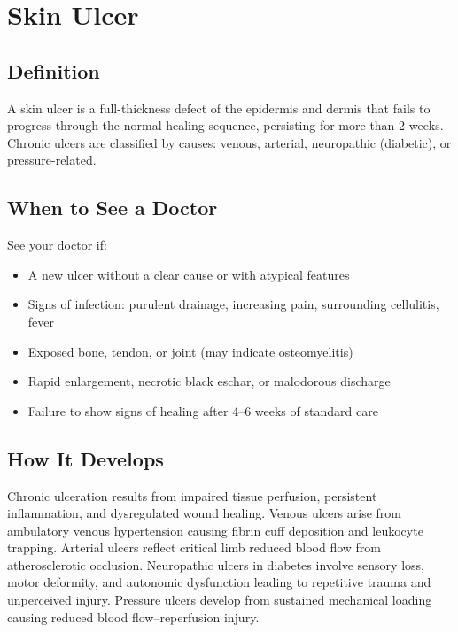 \chapter{Skin Ulcer}

\section*{Definition}
A skin ulcer is a full-thickness defect of the epidermis and dermis that fails to progress through the normal healing sequence, persisting for more than 2 weeks. Chronic ulcers are classified by causes: venous, arterial, neuropathic (diabetic), or pressure-related.

\section*{When to See a Doctor}
See your doctor if:
\begin{itemize}
  \item A new ulcer without a clear cause or with atypical features
  \item Signs of infection: purulent drainage, increasing pain, surrounding cellulitis, fever
  \item Exposed bone, tendon, or joint (may indicate osteomyelitis)
  \item Rapid enlargement, necrotic black eschar, or malodorous discharge
  \item Failure to show signs of healing after 4--6 weeks of standard care
\end{itemize}

\section*{How It Develops}
Chronic ulceration results from impaired tissue perfusion, persistent inflammation, and dysregulated wound healing. Venous ulcers arise from ambulatory venous hypertension causing fibrin cuff deposition and leukocyte trapping. Arterial ulcers reflect critical limb reduced blood flow from atherosclerotic occlusion. Neuropathic ulcers in diabetes involve sensory loss, motor deformity, and autonomic dysfunction leading to repetitive trauma and unperceived injury. Pressure ulcers develop from sustained mechanical loading causing reduced blood flow--reperfusion injury.

